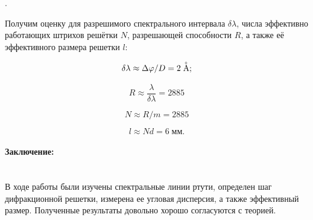 \documentclass[a4paper, 12pt]{article}
\newcommand{\parag}[1]{\paragraph*{#1:}}
\newcounter{Points}
\newcommand{\point}{\arabic{Points}. \addtocounter{Points}{1}}
\begin{document}
\point Получим оценку для разрешимого спектрального интервала $ \delta\lambda $, числа эффективно работающих штрихов решётки $ N $, разрешающей способности $ R $, а также её эффективного размера решетки $ l $:

\begin{equation*}
    \delta\lambda \approx \Delta\varphi/D = 2 \buildrel _{\circ} \over {\mathrm{A}};
\end{equation*}

\begin{equation*}
    R \approx \frac{\lambda}{\delta\lambda} = 2885
\end{equation*}

\begin{equation*}
    N \approx R/m = 2885
\end{equation*}

\begin{equation*}
    l \approx Nd = 6\; \text{мм.}
\end{equation*}

\parag {Заключение} ~\\
В ходе работы были изучены спектральные линии ртути, определен шаг дифракционной решетки, измерена ее угловая дисперсия, а также эффективный размер. Полученные результаты довольно хорошо согласуются с теорией. 
\end{document}
